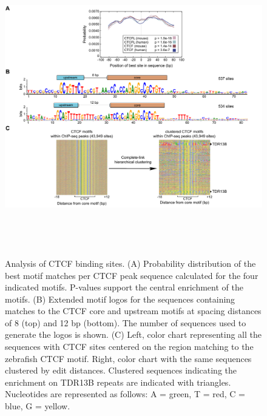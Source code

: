 		\begin{figure}[h!]
			\centering
			\includegraphics[width=14cm,height=13cm]{CTCF_paper/Figure_S3.pdf}
  			\caption[seven]{Analysis of CTCF binding sites.
(A) Probability distribution of the best motif matches per CTCF peak sequence calculated for the four indicated motifs. P-values support the central enrichment of the motifs.
(B) Extended motif logos for the sequences containing matches to the CTCF core and upstream motifs at spacing distances of 8 (top) and 12 bp (bottom). The number of sequences used to generate the logos is shown.
(C)  Left, color chart representing all the sequences with CTCF sites centered on the region matching to the zebrafish CTCF motif. Right, color chart with the same sequences clustered by edit distances. Clustered sequences indicating the enrichment on TDR13B repeats are indicated with triangles. Nucleotides are represented as follows: A = green, T = red, C = blue, G = yellow.}
			\label{seven}
		\end{figure}

		\newpage

